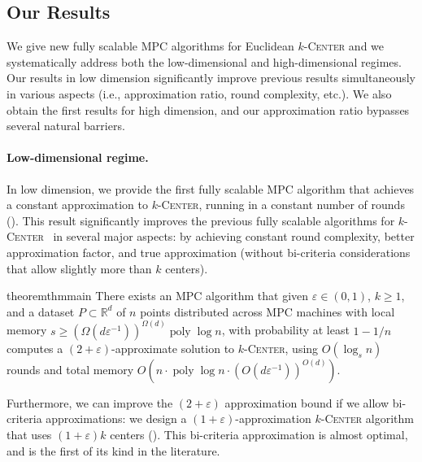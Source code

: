 \documentclass[11pt,letterpaper]{article}
\theoremstyle{plain}
\theoremstyle{definition}
\theoremstyle{remark}
\newcommand{\ProblemName}[1]{\textsc{#1}}
\newcommand{\kCenter}{$k$-\ProblemName{Center}\xspace}
\DeclareMathOperator{\poly}{poly}
\renewcommand{\epsilon}{\ensuremath{\varepsilon}}
\let\epsilon\varepsilon
\begin{document}
\subsection{Our Results}
\label{sec:result}
We give new fully scalable MPC algorithms for Euclidean \kCenter
and we systematically address both the low-dimensional and high-dimensional regimes.
Our results in low dimension significantly improve previous results simultaneously in various aspects (i.e., approximation ratio, round complexity, etc.).
We also obtain the first results for high dimension, and our approximation ratio bypasses several natural barriers.








\paragraph{Low-dimensional regime.}
In low dimension, we provide the first fully scalable MPC algorithm that achieves a constant approximation to \kCenter, running in a constant number of rounds ().
This result significantly improves the previous fully scalable algorithms for \kCenter~\cite{BEFM21,CCM23} in several major aspects: by achieving constant round complexity, better approximation factor, and true approximation (without bi-criteria considerations that allow slightly more than $k$ centers).















\begin{restatable}{theorem}{thmmain}
    \label{thm:low_dim_2approx}
There exists an MPC algorithm that given $\epsilon\in (0,1)$, $k \ge 1$, and a dataset $P \subset \mathbb{R}^d$ of $n$ points  distributed across MPC machines with local memory $s \geq (\Omega(d \epsilon^{-1}))^{\Omega(d)} \poly\log n$,
with probability at least $1-1/n$ computes a $(2 + \varepsilon)$-approximate solution to \kCenter,
using $O(\log_s n)$ rounds and total memory $O(n \cdot \poly\log n \cdot (O(d \epsilon^{-1}))^{O(d)})$.
\end{restatable}


Furthermore, we can improve the $(2+\epsilon)$ approximation bound if we allow bi-criteria approximations: we design a $(1 + \epsilon)$-approximation \kCenter algorithm that uses $(1 + \epsilon)k$ centers ().
This bi-criteria approximation is almost optimal, and is the first of its kind in the literature.
\end{document}

